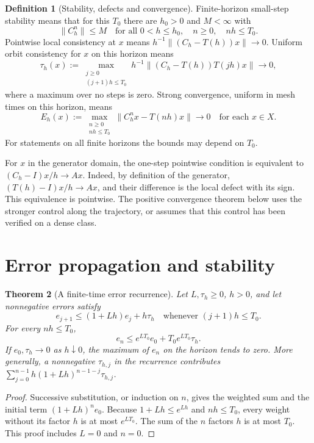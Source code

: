 \documentclass[11pt,oneside,openany]{book}
\theoremstyle{plain}
\newtheorem{theorem}{Theorem}[chapter]
\theoremstyle{definition}
\newtheorem{definition}[theorem]{Definition}
\theoremstyle{remark}
\begin{document}
\begin{definition}[Stability, defects and convergence]\label{p206:W16}
Finite-horizon small-step stability means that for this \(T_0\)
there are \(h_0>0\) and \(M<\infty\) with
\[
 \|C_h^n\|\le M\quad\text{for all }0<h\le h_0,\quad
                        n\ge0,\quad nh\le T_0.
\]
Pointwise local consistency at \(x\) means
\(h^{-1}\|(C_h-T(h))x\|\to0\).
Uniform orbit consistency for \(x\) on this horizon means
\[
 \tau_h(x):=\max_{\substack{j\ge0\\(j+1)h\le T_0}}
      h^{-1}\|(C_h-T(h))T(jh)x\|\longrightarrow0,
\]
where a maximum over no steps is zero.
Strong convergence, uniform in mesh times on this horizon, means
\[
 E_h(x):=\max_{\substack{n\ge0\\nh\le T_0}}
                    \|C_h^n x-T(nh)x\|\longrightarrow0
              \quad\text{for each }x\in X.
\]
For statements on all finite horizons the bounds may depend on \(T_0\).
\end{definition}
For \(x\) in the generator domain, the one-step pointwise
condition is equivalent to
\((C_h-I)x/h\to Ax\). Indeed, by definition of the generator,
\((T(h)-I)x/h\to Ax\), and their difference is the local defect
with its sign. This equivalence is pointwise.
The positive convergence theorem below uses the stronger control
along the trajectory, or assumes that this control has been
verified on a dense class.

\section{Error propagation and stability}

\begin{theorem}[A finite-time error recurrence]\label{p206:W17}
Let \(L,\tau_h\ge0\), \(h>0\), and let nonnegative errors satisfy
\[
 e_{j+1}\le(1+Lh)e_j+h\tau_h
                 \quad\text{whenever }(j+1)h\le T_0.
\]
For every \(nh\le T_0\),
\[
 e_n\le e^{LT_0}e_0+T_0e^{LT_0}\tau_h .
\]
If \(e_0,\tau_h\to0\) as \(h\downarrow0\), the maximum of \(e_n\)
on the horizon tends to zero. More generally, a nonnegative
\(\tau_{h,j}\) in the recurrence contributes
\(\sum_{j=0}^{n-1}h(1+Lh)^{n-1-j}\tau_{h,j}\).
\end{theorem}
\begin{proof}
Successive substitution, or induction on \(n\), gives the weighted
sum and the initial term \((1+Lh)^n e_0\).
Because \(1+Lh\le e^{Lh}\) and \(nh\le T_0\), every weight
without its factor \(h\) is at most \(e^{LT_0}\).
The sum of the \(n\) factors \(h\) is at most \(T_0\).
This proof includes \(L=0\) and \(n=0\).
\end{proof}
\end{document}
